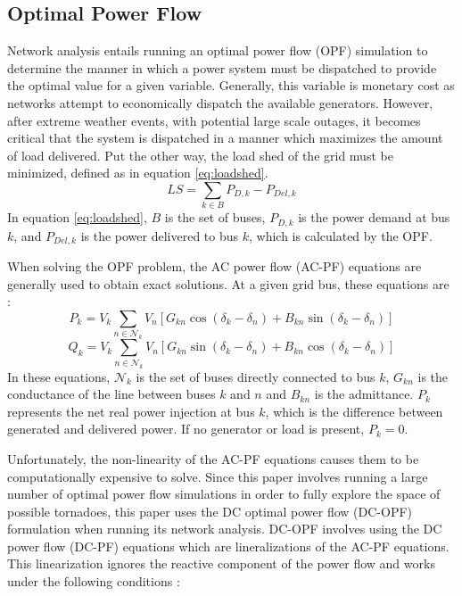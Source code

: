 \documentclass[12pt]{article}
\begin{document}
\subsection{Optimal Power Flow}
Network analysis entails running an optimal power flow (OPF) simulation to determine the manner in which a power system must be dispatched to provide the optimal value for a given variable. Generally, this variable is monetary cost as networks attempt to economically dispatch the available generators. However, after extreme weather events, with potential large scale outages, it becomes critical that the system is dispatched in a manner which maximizes the amount of load delivered. Put the other way, the load shed of the grid must be minimized, defined as in equation \eqref{eq:loadshed}.
\begin{equation}
    LS = \sum_{k\in B}P_{D,k} - P_{Del, k}   
    \label{eq:loadshed}
\end{equation}
In equation \eqref{eq:loadshed}, $B$ is the set of buses, $P_{D, k}$ is the power demand at bus $k$, and $P_{Del, k}$ is the power delivered to bus $k$, which is calculated by the OPF. \par
When solving the OPF problem, the AC power flow (AC-PF) equations are generally used to obtain exact solutions. At a given grid bus, these equations are \cite{purchala2005}:
\begin{equation}
    P_k = V_k \sum_{n \in \mathcal{N}_k} V_n \left[ G_{kn} \cos(\delta_k - \delta_n) + B_{kn} \sin(\delta_k - \delta_n) \right]
    \label{eq:ACPFreal}
\end{equation}
\begin{equation}
    Q_k = V_k \sum_{n \in \mathcal{N}_k} V_n \left[ G_{kn} \sin(\delta_k - \delta_n) + B_{kn} \cos(\delta_k - \delta_n) \right]
    \label{eq:ACPFim}
\end{equation}
In these equations, $\mathcal{N}_k$ is the set of buses directly connected to bus $k$, $G_{kn}$ is the conductance of the line between buses $k$ and $n$ and $B_{kn}$ is the admittance. $P_k$ represents the net real power injection at bus $k$, which is the difference between generated and delivered power. If no generator or load is present, $P_k = 0$. \par
Unfortunately, the non-linearity of the AC-PF equations causes them to be computationally expensive to solve. Since this paper involves running a large number of optimal power flow simulations in order to fully explore the space of possible tornadoes, this paper uses the DC optimal power flow (DC-OPF) formulation when running its network analysis. DC-OPF involves using the DC power flow (DC-PF) equations which are lineralizations of the AC-PF equations. This linearization ignores the reactive component of the power flow and works under the following conditions \cite{purchala2005}: 
\end{document}
